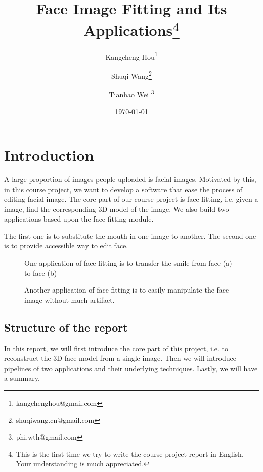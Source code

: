 \documentclass{article}
\title{Face Image Fitting and Its Applications\footnote{This is the first time we try to write the course project report in English. Your understanding is much appreciated.}}
\author{Kangcheng Hou\footnote{kangchenghou@gmail.com} \and Shuqi Wang\footnote{shuqiwang.cn@gmail.com} \and Tianhao Wei \footnote{phi.wth@gmail.com}}
\date{\today}
\begin{document}
\maketitle
\tableofcontents

\section{Introduction}
A large proportion of images people uploaded is facial images. Motivated by this, in this course project, we want to develop a software that ease the process of editing facial image. The core part of our course project is face fitting, i.e. given a image, find the corresponding 3D model of the image. We also build two applications based upon the face fitting module.

The first one is to substitute the mouth in one image to another. The second one is to provide accessible way to edit face.
\begin{figure}
    \centering
    \hfill
    \caption{One application of face fitting is to transfer the smile from face (a) to face (b)}
\end{figure}
\begin{figure}
    \centering
    \hfill
    \caption{Another application of face fitting is to easily manipulate the face image without much artifact.}
\end{figure}

\subsection{Structure of the report}
In this report, we will first introduce the core part of this project, i.e. to reconstruct the 3D face model from a single image. Then we will introduce pipelines of two applications and their underlying techniques. Lastly, we will have a summary.
      







 
\end{document}

